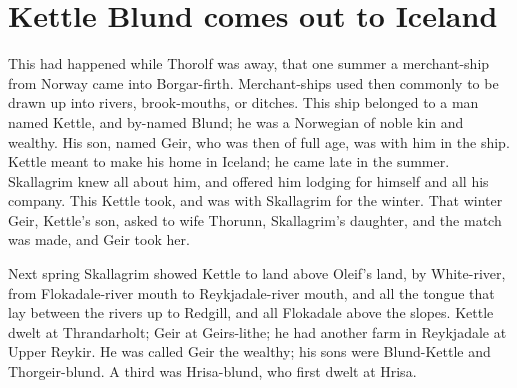 \chapter{Kettle Blund comes out to Iceland}

This had happened while Thorolf was away, that one summer a merchant-ship from Norway came into Borgar-firth. Merchant-ships used then commonly to be drawn up into rivers, brook-mouths, or ditches. This ship belonged to a man named Kettle, and by-named Blund; he was a Norwegian of noble kin and wealthy. His son, named Geir, who was then of full age, was with him in the ship. Kettle meant to make his home in Iceland; he came late in the summer. Skallagrim knew all about him, and offered him lodging for himself and all his company. This Kettle took, and was with Skallagrim for the winter. That winter Geir, Kettle's son, asked to wife Thorunn, Skallagrim's daughter, and the match was made, and Geir took her.

Next spring Skallagrim showed Kettle to land above Oleif's land, by White-river, from Flokadale-river mouth to Reykjadale-river mouth, and all the tongue that lay between the rivers up to Redgill, and all Flokadale above the slopes. Kettle dwelt at Thrandarholt; Geir at Geirs-lithe; he had another farm in Reykjadale at Upper Reykir. He was called Geir the wealthy; his sons were Blund-Kettle and Thorgeir-blund. A third was Hrisa-blund, who first dwelt at Hrisa.
